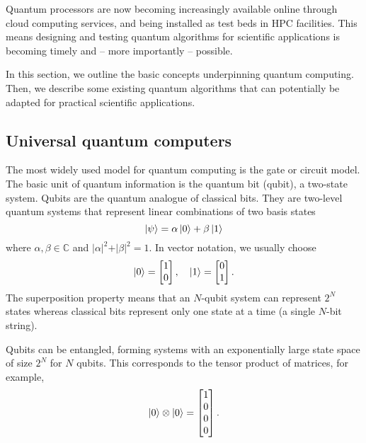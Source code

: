 \documentclass[10pt]{iopart}
\begin{document}
Quantum processors are now becoming increasingly available online through cloud computing services, and being installed as test beds in HPC facilities. This means designing and testing quantum algorithms for scientific applications is becoming timely and -- more importantly -- possible.

In this section, we outline the basic concepts underpinning quantum computing. Then, we describe some existing quantum algorithms that can potentially be adapted for practical scientific applications.

\subsection{Universal quantum computers}

The most widely used model for quantum computing is the gate or circuit model. The basic unit of quantum information is the quantum bit (qubit), a two-state system. Qubits are the quantum analogue of classical bits. They are two-level quantum systems that represent linear combinations of two basis states 
\begin{equation}
\ket{\psi} = \alpha\ket{0} + \beta\ket{1}
\end{equation} 
where $\alpha,\beta \in \mathbb{C}$ and $\vert\alpha\vert^2 + \vert\beta\vert^2 = 1$. 
In vector notation, we usually choose 
\begin{equation}
\ket{0} = \begin{bmatrix} 1 \\ 0 \end{bmatrix}, \quad \ket{1} = \begin{bmatrix} 0 \\ 1 \end{bmatrix}.
\end{equation}
The superposition property means that an $N$-qubit system can represent $2^N$ states whereas classical bits represent only one state at a time (a single $N$-bit string).  

Qubits can be entangled, forming systems with an exponentially large state space of size $2^N$ for $N$ qubits.  This corresponds to the tensor product of matrices, for example, 
\begin{equation}
\ket{0}\otimes\ket{0} = \begin{bmatrix} 1 \\ 0 \\ 0 \\ 0 \end{bmatrix}.
\end{equation} 
\end{document}
